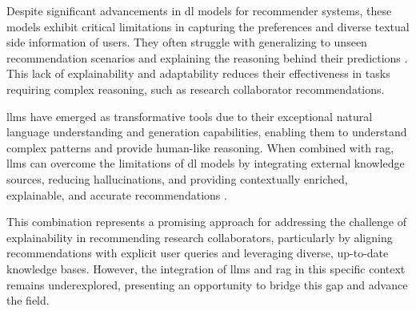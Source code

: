 Despite significant advancements in \gls{dl} models for recommender systems, these models exhibit critical limitations in capturing the preferences and diverse textual side information of users.
They often struggle with generalizing to unseen recommendation scenarios and explaining the reasoning behind their predictions \cite{Zhao2024}.
This lack of explainability and adaptability reduces their effectiveness in tasks requiring complex reasoning, such as research collaborator recommendations.

\glspl{llm} have emerged as transformative tools due to their exceptional natural language understanding and generation capabilities, enabling them to understand complex patterns and provide human-like reasoning.
When combined with \gls{rag}, \glspl{llm} can overcome the limitations of \gls{dl} models by integrating external knowledge sources, reducing hallucinations, and providing contextually enriched, explainable, and accurate recommendations \cite{Deldjoo2024}.

This combination represents a promising approach for addressing the challenge of explainability in recommending research collaborators, particularly by aligning recommendations with explicit user queries and leveraging diverse, up-to-date knowledge bases.
However, the integration of \glspl{llm} and \gls{rag} in this specific context remains underexplored, presenting an opportunity to bridge this gap and advance the field.